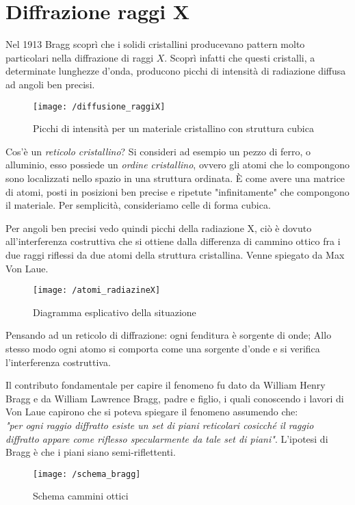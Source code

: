 

\section{Diffrazione raggi X}
Nel 1913 Bragg scoprì che i solidi cristallini producevano pattern molto particolari nella diffrazione di raggi $X$.
Scoprì infatti che questi cristalli, a determinate lunghezze d'onda, producono picchi di intensità di radiazione diffusa ad angoli ben precisi.

\begin{figure}[h]
\centering
\texttt{[image: /diffusione\_raggiX]}
\caption{Picchi di intensità per un materiale cristallino con struttura cubica}
\end{figure}

Cos'è un \textit{reticolo cristallino}? 
Si consideri ad esempio un pezzo di ferro, o alluminio, esso possiede un \textit{ordine cristallino}, ovvero gli atomi che lo compongono sono localizzati nello spazio in una struttura ordinata.
È come avere una matrice di atomi, posti in posizioni ben precise e ripetute "infinitamente" che compongono il materiale.
Per semplicità, consideriamo celle di forma cubica.

Per angoli ben precisi vedo quindi picchi della radiazione X, ciò è dovuto all'interferenza costruttiva che si ottiene dalla differenza di cammino ottico fra i due raggi riflessi da due atomi della struttura cristallina.
Venne spiegato da Max Von Laue.
\begin{figure}[h]
\centering
\texttt{[image: /atomi\_radiazineX]}
\caption{Diagramma esplicativo della situazione}
\end{figure}

Pensando ad un reticolo di diffrazione: ogni fenditura è sorgente di onde;
Allo stesso modo ogni atomo si comporta come una sorgente d'onde e si verifica l'interferenza costruttiva.

Il contributo fondamentale per capire il fenomeno fu dato da William Henry Bragg e da William Lawrence Bragg, padre e figlio, i quali conoscendo i lavori di Von Laue capirono che si poteva spiegare il fenomeno assumendo che: \\ 
\textit{"per ogni raggio diffratto esiste un set di piani reticolari cosicché il raggio diffratto appare come riflesso specularmente da tale set di piani"}.
L'ipotesi di Bragg è che i piani siano semi-riflettenti.
\begin{figure}[h]
\centering
\texttt{[image: /schema\_bragg]}
\caption{Schema cammini ottici}
\label{cammino_ottico}
\end{figure}

